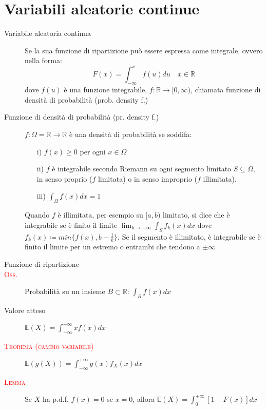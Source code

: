\documentclass[a4paper,10pt]{article}
\newcommand{\myth}{\normalfont \scshape \textcolor{red}} %
\newcommand{\re}{\mathbb{R}} %
\newcommand{\ex}{\mathbb{E}} %
\theoremstyle{remark}
\theoremstyle{definition}
\begin{document}
\pagebreak

\part{Variabili aleatorie continue}
\begin{description}
\item[Variabile aleatoria continua] Se la sua funzione di ripartizione può essere espressa come integrale, ovvero nella forma:
\[F(x)=\int_{-\infty}^{x}f(u)du \quad x\in\mathbb{R}\]
dove $f(u)$ è una funzione integrabile, $f: \mathbb{R}\to[0,\infty)$, chiamata funzione di densità di  probabilità (prob. density f.)

\item[Funzione di densità di probabilità (pr. density f.)] $f: \Omega = \re \to \re$ è una densità di probabilità se soddifa:
\begin{itemize}
    \item[i)] $f(x)\ge0$ per ogni $x\in\Omega$
    \item[ii)] $f$ è integrabile secondo Riemann su ogni segmento limitato $S\subseteq \Omega$, in senso proprio ($f$ limitata) o in senso improprio ($f$ illimitata).
    \item[iii)] $\int_\Omega f(x)dx=1$ 
\end{itemize}
Quando $f$ è illimitata, per esempio su $[a,b)$ limitato, si dice che è integrabile se è finito il limite $\lim_{k\to+\infty}\int_S f_k(x)dx$ dove $f_k(x)\coloneqq min\{f(x),b-\frac{1}{k}\}$. Se il segmento è illimitato, è integrabile se è finito il limite per un estremo o entrambi che tendono a $\pm\infty$


\item[Funzione di ripartizione]
\item[\myth{Oss.}] Probabilità su un insieme $B\subset \re$: $\int_B f(x)dx$
\item[Valore atteso] $\ex(X)=\int_{-\infty}^{+\infty}xf(x)dx$
\item[\myth{Teorema (cambio variabile)}] $\ex(g(X))=\int_{-\infty}^{+\infty}g(x)f_X(x)dx$
\item[\myth{Lemma}] Se $X$ ha p.d.f. $f(x)=0$ se $x=0$, allora $\ex(X)=\int_0^{+\infty}[1-F(x)]dx$ 
\end{description}
\end{document}
